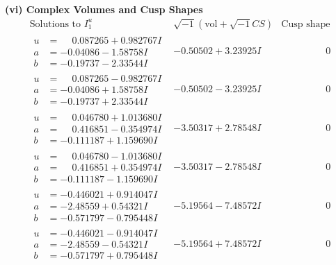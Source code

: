 \documentclass[1p]{elsarticle_modified}
\theoremstyle{definition}
\newcommand{\I}{\sqrt{-1}}
\begin{document}
\newpage\flushleft \textbf{(vi) Complex Volumes and Cusp Shapes}
$$\begin{array}{c|c|c}  
\text{Solutions to }I^u_{1}& \I (\text{vol} + \sqrt{-1}CS) & \text{Cusp shape}\\
 \hline 
\begin{aligned}
u &= \phantom{-}0.087265 + 0.982767 I \\
a &= -0.04086 - 1.58758 I \\
b &= -0.19737 - 2.33544 I\end{aligned}
 & -0.50502 + 3.23925 I & \phantom{-0.000000 } 0 \\ \hline\begin{aligned}
u &= \phantom{-}0.087265 - 0.982767 I \\
a &= -0.04086 + 1.58758 I \\
b &= -0.19737 + 2.33544 I\end{aligned}
 & -0.50502 - 3.23925 I & \phantom{-0.000000 } 0 \\ \hline\begin{aligned}
u &= \phantom{-}0.046780 + 1.013680 I \\
a &= \phantom{-}0.416851 - 0.354974 I \\
b &= -0.111187 + 1.159690 I\end{aligned}
 & -3.50317 + 2.78548 I & \phantom{-0.000000 } 0 \\ \hline\begin{aligned}
u &= \phantom{-}0.046780 - 1.013680 I \\
a &= \phantom{-}0.416851 + 0.354974 I \\
b &= -0.111187 - 1.159690 I\end{aligned}
 & -3.50317 - 2.78548 I & \phantom{-0.000000 } 0 \\ \hline\begin{aligned}
u &= -0.446021 + 0.914047 I \\
a &= -2.48559 + 0.54321 I \\
b &= -0.571797 - 0.795448 I\end{aligned}
 & -5.19564 - 7.48572 I & \phantom{-0.000000 } 0 \\ \hline\begin{aligned}
u &= -0.446021 - 0.914047 I \\
a &= -2.48559 - 0.54321 I \\
b &= -0.571797 + 0.795448 I\end{aligned}
 & -5.19564 + 7.48572 I & \phantom{-0.000000 } 0 \\ \hline\begin{aligned}

\end{aligned}
\end{array}$$
\end{document}
